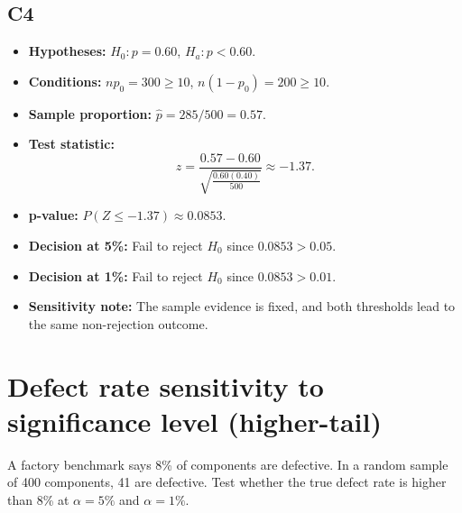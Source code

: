 \subsection*{C4}
\begin{itemize}
    \item \textbf{Hypotheses:} \(H_0\colon p=0.60\), \(H_a\colon p<0.60\).
    \item \textbf{Conditions:} \(np_0=300\ge10\), \(n(1-p_0)=200\ge10\).
    \item \textbf{Sample proportion:} \(\hat p=285/500=0.57\).
    \item \textbf{Test statistic:}
    \[
    z=\frac{0.57-0.60}{\sqrt{\frac{0.60(0.40)}{500}}}\approx -1.37.
    \]
    \item \textbf{p-value:} \(P(Z\le -1.37)\approx 0.0853\).
    \item \textbf{Decision at 5\%:} Fail to reject \(H_0\) since \(0.0853>0.05\).
    \item \textbf{Decision at 1\%:} Fail to reject \(H_0\) since \(0.0853>0.01\).
    \item \textbf{Sensitivity note:} The sample evidence is fixed, and both thresholds lead to the same non-rejection outcome.
\end{itemize}

\begin{center}
\hspace{0.8cm}
\end{center}


\section{Defect rate sensitivity to significance level (higher-tail)}
A factory benchmark says 8\% of components are defective. In a random sample of 400 components, 41 are defective. Test whether the true defect rate is higher than 8\% at \(\alpha=5\%\) and \(\alpha=1\%\).

